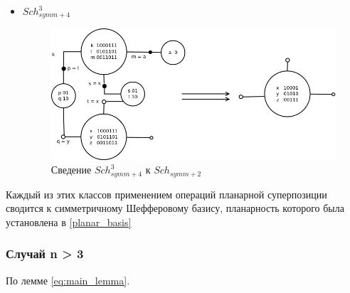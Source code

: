 \documentclass[12pt]{article}
\begin{document}
\begin{itemize}
\begin{figure}[htb]
\label{fig:3_3to3_2}
\end{figure}
\item{$Sch_{symm+4}^3$}
\begin{figure}[htb]
\centering
\includegraphics[width=1.0\textwidth]{3_4to3_2.png}
\caption{Сведение $Sch_{symm+4}^3$ к $Sch_{symm+2}$}
\label{fig:3_4to3_2}
\end{figure}
\end{itemize}

Каждый из этих классов применением операций планарной суперпозиции сводится к 
симметричному Шефферовому базису, планарность которого была установлена в \ref{planar_basis}

\subsubsection{Случай n > 3}
По лемме \ref{eq:main_lemma}.


\end{document}
